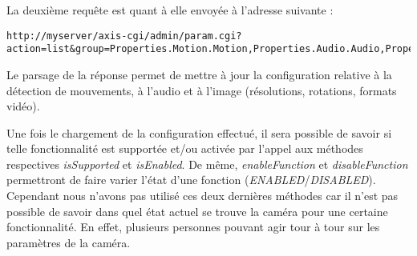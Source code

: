 La deuxième requête est quant à elle envoyée à l'adresse suivante :
\begin{lstlisting}
http://myserver/axis-cgi/admin/param.cgi?action=list&group=Properties.Motion.Motion,Properties.Audio.Audio,Properties.Image
\end{lstlisting}
Le parsage de la réponse permet de mettre à jour la configuration relative à la détection de mouvements, à l'audio et à l'image (résolutions, rotations, formats vidéo).

Une fois le chargement de la configuration effectué, il sera possible de savoir si telle fonctionnalité est supportée et/ou activée par l'appel aux méthodes respectives \textit{isSupported} et \textit{isEnabled}.
De même, \textit{enableFunction} et \textit{disableFunction} permettront de faire varier l'état d'une fonction (\textit{ENABLED}/\textit{DISABLED}). Cependant nous n'avons pas utilisé ces deux dernières méthodes car il n'est pas possible de savoir dans quel état actuel se trouve la caméra pour une certaine fonctionnalité.
En effet, plusieurs personnes pouvant agir tour à tour sur les paramètres de la caméra.

